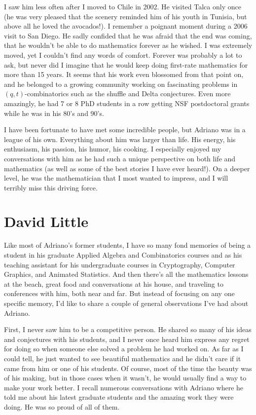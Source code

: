\documentclass{amsart}
\begin{document}
I saw him less often after I moved to Chile in 2002.  He visited Talca only once (he was very pleased that the scenery reminded him of his youth in Tunisia, but above all he loved the avocados!). I remember a poignant moment during a 2006 visit to San Diego. He sadly confided that he was afraid that the end was coming, that he wouldn't be able to do mathematics forever as he wished. I was extremely moved, yet I couldn't find any words of comfort. Forever was probably a lot to ask, but never did I imagine that he would keep doing first-rate mathematics for more than 15 years.  It seems that his work  even blossomed from that point on, and he belonged to a growing community working on fascinating problems in $(q,t)$-combinatorics such as the shuffle and Delta conjectures. Even more amazingly, he had 7 or 8 PhD students in a row getting NSF postdoctoral grants while he was in his 80's and 90's.

I have been fortunate to have met some incredible people, but Adriano was in a league of his own. Everything about him was larger than life. His energy, his enthusiasm, his passion, his humor, his cooking. I especially enjoyed my conversations with him as he had such a unique perspective  on both life and  mathematics (as well as some of the best stories I have ever heard!). On a deeper level, he was the mathematician that I most wanted to impress, and I will terribly miss this driving force.

\section*{David Little}

Like most of Adriano's former students, I have so many fond memories of being a student in his graduate Applied Algebra and Combinatorics courses and as his teaching assistant for his undergraduate courses in Cryptography, Computer Graphics, and Animated Statistics.  And then there's all the mathematics lessons at the beach, great food and conversations at his house, and traveling to conferences with him, both near and far.  But instead of focusing on any one specific memory, I'd like to share a couple of general observations I've had about Adriano. 

First, I never saw him to be a competitive person.  He shared so many of his ideas and conjectures with his students, and I never once heard him express any regret for doing so when someone else solved a problem he had worked on.  As far as I could tell, he just wanted to see beautiful mathematics and he didn’t care if it came from him or one of his students.  Of course, most of the time the beauty was of his making, but in those cases when it wasn't, he would usually find a way to make your work better. I recall numerous conversations with Adriano where he told me about his latest graduate students and the amazing work they were doing.  He was so proud of all of them.
\end{document}
